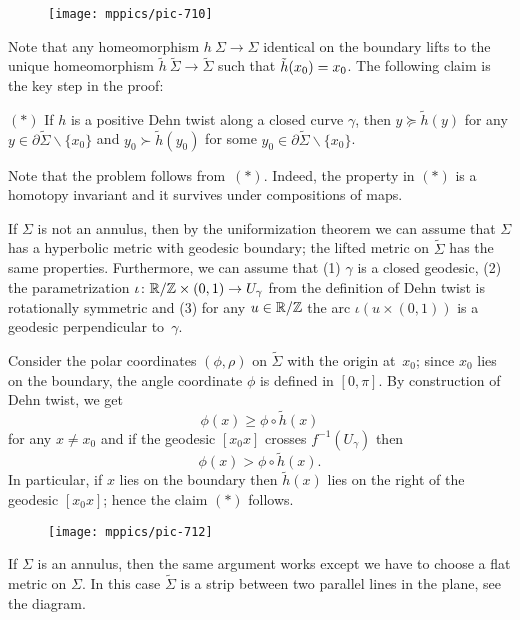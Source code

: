 {

\begin{wrapfigure}{r}{27 mm}
\vskip-0mm
\centering
\texttt{[image: mppics/pic-710]}
\end{wrapfigure}

Note that any homeomorphism $h\:\Sigma\to\Sigma$ identical on the boundary
lifts to the unique homeomorphism $\tilde h\:\tilde \Sigma\to\tilde\Sigma$ 
such that $\tilde h(x_0)\z=x_0$.
The following claim is the key step in the proof:

}

\begin{cl}{$({*})$} 
If $h$ is a positive Dehn twist along a closed curve $\gamma$,
then $y\succeq \tilde h(y)$ for any $y\in\partial\tilde\Sigma\backslash\{x_0\}$
and $y_0\succ\tilde h(y_0)$ for some $y_0\in\partial\tilde\Sigma\backslash\{x_0\}$.
\end{cl}

Note that the problem follows from~$({*})$.
Indeed, the property in $({*})$ is a homotopy invariant 
and it survives under compositions of maps.

\medskip

If $\Sigma$ is not an annulus,
then by the uniformization theorem we can assume that $\Sigma$ has a  hyperbolic metric with geodesic boundary; 
the lifted metric on $\tilde\Sigma$ has the same properties.
Furthermore, we can assume that (1) $\gamma$ is a closed geodesic,
(2) the parametrization $\iota\:\RR/\ZZ\z\times (0,1)\to U_\gamma$ from the definition of Dehn twist is rotationally symmetric 
and (3) for any $u\in \mathbb{R}/\mathbb{Z}$ the arc $\iota(u\times (0,1))$ is a geodesic perpendicular to~$\gamma$. 

Consider the polar coordinates $(\phi,\rho)$ on $\tilde\Sigma$ with the origin at~$x_0$;
since $x_0$ lies on the boundary, the angle coordinate $\phi$ is defined in $[0,\pi]$. 
By construction of Dehn twist, we get 
\[\phi(x)\ge \phi\circ\tilde h(x)\]
for any $x\ne x_0$ 
and if the geodesic $[x_0x]$ crosses $f^{-1}(U_\gamma)$ then 
\[\phi(x)> \phi\circ\tilde h(x).\]
In particular, if $x$ lies on the boundary then $\tilde h(x)$ lies on the right of the geodesic $[x_0x]$; hence the claim $({*})$ follows. 

\begin{figure}[h!]
\vskip0mm
\centering
\texttt{[image: mppics/pic-712]}
\end{figure}

If $\Sigma$ is an annulus, then the same argument works except we have to choose a flat metric on $\Sigma$.
In this case $\tilde \Sigma$ is a strip between two parallel lines in the plane, see the diagram.
\qeds

